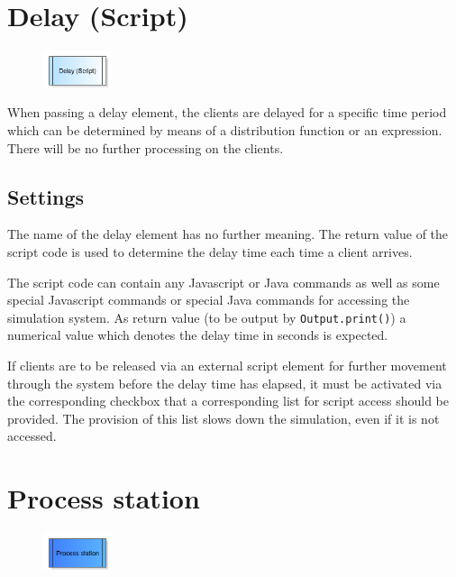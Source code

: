 \section{Delay (Script)}
\label{ref:ModelElementDelayJS}

\begin{figure}
\vspace{-22pt}
\includegraphics[width=2cm]{imageModelElementDelayJS.png}
\vspace{-22pt}
\end{figure}

When passing a delay element, the clients are delayed for a specific time period which can be determined
 by means of a distribution function or an expression. There will be no further processing on the clients.

\subsection*{Settings}

The name of the delay element has no further meaning. 
The return value of the script code is used to determine the delay time each time a client arrives. 

The script code can contain any Javascript or Java commands as well as some
special Javascript commands or
special Java commands for accessing the simulation system.
As return value (to be output by \texttt{Output.print()}) a numerical value
which denotes the delay time in seconds is expected.

If clients are to be released via an external script element for further movement through the system before the delay time has elapsed,
it must be activated via the corresponding checkbox that a corresponding list for script access should be provided. The provision of
this list slows down the simulation, even if it is not accessed.


\section{Process station}
\label{ref:ModelElementProcess}

\begin{figure}
\vspace{-22pt}
\includegraphics[width=2cm]{imageModelElementProcess.png}
\vspace{-22pt}
\end{figure}

